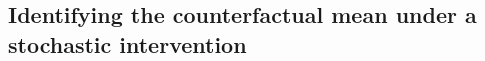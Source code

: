 

\subsection{Identifying the counterfactual mean under a stochastic
intervention}\label{stoch_lit}

